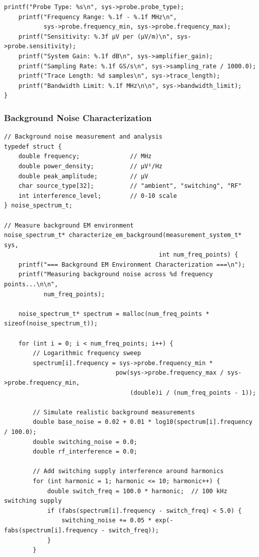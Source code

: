 \documentclass[11pt,a4paper]{article}
\theoremstyle{definition}
\begin{document}
\begin{lstlisting}[caption={EM Measurement System Configuration}]
    printf("Probe Type: %s\n", sys->probe.probe_type);
    printf("Frequency Range: %.1f - %.1f MHz\n", 
           sys->probe.frequency_min, sys->probe.frequency_max);
    printf("Sensitivity: %.3f μV per (μV/m)\n", sys->probe.sensitivity);
    printf("System Gain: %.1f dB\n", sys->amplifier_gain);
    printf("Sampling Rate: %.1f GS/s\n", sys->sampling_rate / 1000.0);
    printf("Trace Length: %d samples\n", sys->trace_length);
    printf("Bandwidth Limit: %.1f MHz\n\n", sys->bandwidth_limit);
}
\end{lstlisting}

\subsubsection{Background Noise Characterization}

\begin{lstlisting}[caption={Background EM Noise Analysis}]
// Background noise measurement and analysis
typedef struct {
    double frequency;              // MHz
    double power_density;          // μV²/Hz
    double peak_amplitude;         // μV
    char source_type[32];          // "ambient", "switching", "RF"
    int interference_level;        // 0-10 scale
} noise_spectrum_t;

// Measure background EM environment
noise_spectrum_t* characterize_em_background(measurement_system_t* sys, 
                                           int num_freq_points) {
    printf("=== Background EM Environment Characterization ===\n");
    printf("Measuring background noise across %d frequency points...\n\n", 
           num_freq_points);
    
    noise_spectrum_t* spectrum = malloc(num_freq_points * sizeof(noise_spectrum_t));
    
    for (int i = 0; i < num_freq_points; i++) {
        // Logarithmic frequency sweep
        spectrum[i].frequency = sys->probe.frequency_min * 
                               pow(sys->probe.frequency_max / sys->probe.frequency_min, 
                                   (double)i / (num_freq_points - 1));
        
        // Simulate realistic background measurements
        double base_noise = 0.02 + 0.01 * log10(spectrum[i].frequency / 100.0);
        double switching_noise = 0.0;
        double rf_interference = 0.0;
        
        // Add switching supply interference around harmonics
        for (int harmonic = 1; harmonic <= 10; harmonic++) {
            double switch_freq = 100.0 * harmonic;  // 100 kHz switching supply
            if (fabs(spectrum[i].frequency - switch_freq) < 5.0) {
                switching_noise += 0.05 * exp(-fabs(spectrum[i].frequency - switch_freq));
            }
        }
        

\end{lstlisting}
\end{document}
